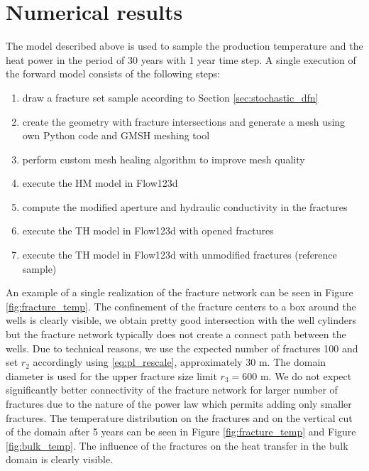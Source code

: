 \documentclass{article}
\begin{document}
\section{Numerical results}
The model described above is used to sample the production temperature and the heat power in the period of 30 years with 1 year time step. A single execution of the forward model consists of the following steps:
\begin{enumerate}
    \item draw a fracture set sample according to Section \ref{sec:stochastic_dfn}
    \item create the geometry with fracture intersections and generate a mesh using own Python code and GMSH meshing tool \cite{GMSH}
    \item perform custom mesh healing algorithm to improve mesh quality
    \item execute the HM model in Flow123d
    \item compute the modified aperture and hydraulic conductivity in the fractures
    \item execute the TH model in Flow123d with opened fractures
    \item execute the TH model in Flow123d with unmodified fractures (reference sample)
\end{enumerate}
An example of a single realization of the fracture network can be seen in Figure \ref{fig:fracture_temp}. The confinement of the fracture centers to a box around the wells is clearly visible, we obtain pretty good intersection with the well cylinders but the fracture network typically does not create a connect path between the wells. Due to technical reasons, we use the expected number of fractures 100 and set $r_2$ accordingly using \eqref{eq:pl_rescale}, approximately 30 m. The domain diameter is used for the upper fracture size limit $r_3=600$ m. We do not expect significantly better connectivity of the fracture network for larger number of fractures due to the nature of the power law which permits adding only smaller fractures. The temperature distribution on the fractures and on the vertical cut of the domain after 5 years can be seen in Figure \ref{fig:fracture_temp} and Figure \ref{fig:bulk_temp}. The influence of the fractures on the heat transfer in the bulk domain is clearly visible.
\end{document}
